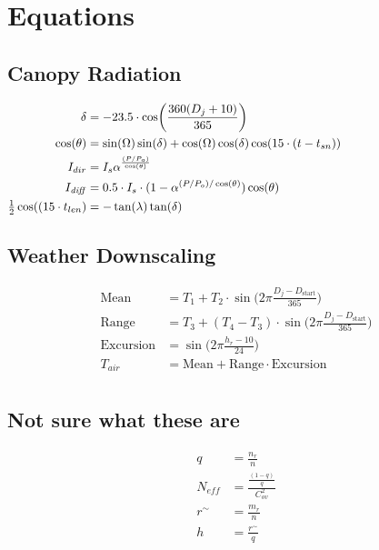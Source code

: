 \documentclass[12pt]{report}
\begin{document}
\section*{Equations}

\subsection*{Canopy Radiation}
\begin{align}
 \delta  &=  -23.5 \cdot \cos\biggl(\frac{360(D_{j}+10)}{365}\biggr) \hspace{2.5in} \label{eqn:delt} \\
 \cos(\theta)   &=  \sin(\Omega)\sin(\delta)+\cos(\Omega)\cos(\delta)\cos(15\cdot(t-t_{sn}))  \label{eqn:costheta}\\
 I_{dir}   &=  I_{s}\alpha^{\frac{(P/P_{o})}{\cos(\theta)}} \label{eqn:Idir}\\
 I_{\mathit{diff}}  &=   0.5 \cdot I_{s}\cdot(1-\alpha^{(P/P_{o})/\cos(\theta)})\cos(\theta) \label{eqn:Idiff} \\
\tfrac{1}{2} \cos((15 \cdot t_{len})  &=  -\tan(\lambda)\tan(\delta) \label{eqn:costlen}\\
\end{align}

\subsection*{Weather Downscaling}
\begin{align}
 \text{Mean}  &=  T_{1} + T_{2}\cdot \sin\biggl(2 \pi \frac{D_{j}-D_{\text{start}}}{365}\biggr) \label{eqn:mean} \\
 \text{Range}   &=  T_{3} + (T_{4}-T_{3})\cdot \sin\biggl(2 \pi \frac{D_{j}-D_{\text{start}}}{365}\biggr) \label{eqn:range}\\
 \text{Excursion}  &=   \sin\biggl(2 \pi \frac{h_{r}-10}{24}\biggr) \label{eqn:excur} \\
 T_{air}  &=   \text{Mean} + \text{Range} \cdot \text{Excursion} \label{eqn:Tair} \\
\end{align}

\subsection*{Not sure what these are}
\begin{align}
 q  &=  \frac{n_r}{n} \label{eqn:q} \\
 N_{\mathit{eff}}  &=  \frac{\frac{(1-q)}{q}}{C_{ov}^{2}} \label{eqn:Neff}\\
 r^{\sim}  &=  \frac{m_r}{n} \label{eqn:rsim} \\
 h  &=  \frac{r^{\sim}}{q} \label{eqn:h} \\
\end{align}
\end{document}
